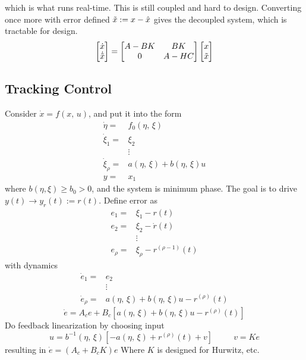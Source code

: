 \documentclass[twocolumn]{article}    %
\begin{document}
which is what runs real-time. This is still coupled and hard to design. Converting once more with error defined \(\Tilde{x} := x -\hat{x}\) gives the decoupled system, which is tractable for design.
\begin{equation*}
    \begin{bmatrix}
        \dot{x} \\ \dot{\Tilde{x}}
    \end{bmatrix} = \begin{bmatrix}
        A-BK & BK \\ 0 & A-HC
    \end{bmatrix} \begin{bmatrix}
        x\\ \tilde{x}
    \end{bmatrix}
\end{equation*}



\subsection*{Tracking Control}
Consider \(\dot{x} = f(x,\,u)\), and put it into the form
\begin{align*}
    \dot{\eta} =& f_0(\eta,\,\xi)\\
    \dot{\xi}_1 = & \xi_2\\
    & \vdots\\
    \dot{\xi}_\rho =& a(\eta,\,\xi) + b(\eta,\,\xi) u\\
    y=& x_1
\end{align*}
where \(b(\eta,\xi) \geq b_0 > 0\), and the system is minimum phase. The goal is to drive \(y(t) \to y_r(t) := r(t)\). Define error as 
\begin{align*}
    e_1 =& \xi_1 - r(t)\\
    e_2 =& \xi_2 - \dot{r}(t)\\
    & \vdots\\
    e_\rho =& \xi_\rho - r^{(\rho-1)}(t)
\end{align*}
with dynamics
\begin{align*}
    \dot{e}_1 =& e_2\\    
    & \vdots\\
    \dot{e}_\rho =& a(\eta,\,\xi) + b(\eta,\,\xi)u - r^{(\rho)}(t)
\end{align*}
\begin{equation*}
    \dot{e} = A_c e + B_c\left[ a(\eta,\,\xi) + b(\eta,\,\xi)u - r^{(\rho)}(t)\right]
\end{equation*}
Do feedback linearization by choosing input 
\begin{equation*}
    u = b^{-1}(\eta,\,\xi) \left[-a(\eta,\,\xi) + r^{(\rho)}(t) + v\right] \hspace{30pt} v = Ke
\end{equation*}
resulting in \(\dot{e} = (A_c + B_cK) e\) Where \(K\) is designed for Hurwitz, etc.
\end{document}
